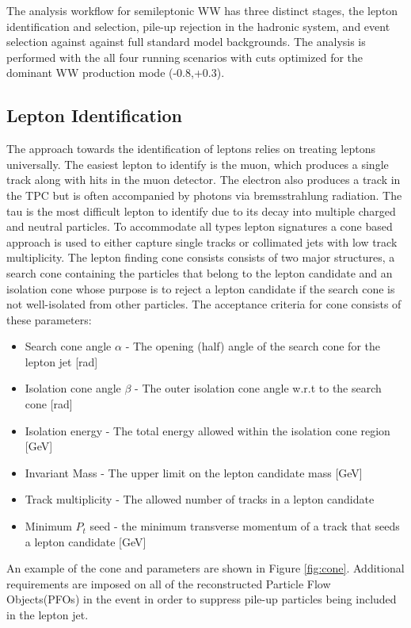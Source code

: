 The analysis workflow for semileptonic WW has three distinct stages, the lepton identification and selection, pile-up rejection in the hadronic system, and event selection against against full standard model backgrounds. The analysis is performed with the all four running scenarios with cuts optimized for the dominant WW production mode (-0.8,+0.3). 


\subsection{Lepton Identification}
\label{subsec:Lepton_ID}
The approach towards the identification of leptons relies on treating leptons universally. The easiest lepton to identify is the muon, which produces a single track along with hits in the muon detector. The electron also produces a track in the TPC but is often accompanied by photons via bremsstrahlung radiation. The tau is the most difficult lepton to identify due to its decay into multiple charged and neutral particles. To accommodate all types lepton signatures a cone based approach is used to either capture single tracks or collimated jets with low track multiplicity. The lepton finding cone consists consists of two major structures, a search cone containing the particles that belong to the lepton candidate and an isolation cone whose purpose is to reject a lepton candidate if the search cone is not well-isolated from other particles. The acceptance criteria for cone consists of these parameters:
\begin{itemize}
\item Search cone angle $\alpha$ - The opening (half) angle of the search cone for the lepton jet [rad]
\item Isolation cone angle $\beta$ - The outer isolation cone angle w.r.t to the search cone [rad]
\item Isolation energy - The total energy allowed within the isolation cone region [GeV]
\item Invariant Mass - The upper limit on the lepton candidate mass [GeV]
\item Track multiplicity - The allowed number of tracks in a lepton candidate
\item Minimum $P_t$ seed - the minimum transverse momentum of a track that seeds a lepton candidate [GeV] 
\end{itemize}
An example of the cone and parameters are shown in Figure \ref{fig:cone}. Additional requirements are imposed on all of the reconstructed Particle Flow Objects(PFOs) in the event in order to suppress pile-up particles being included in the lepton jet.

